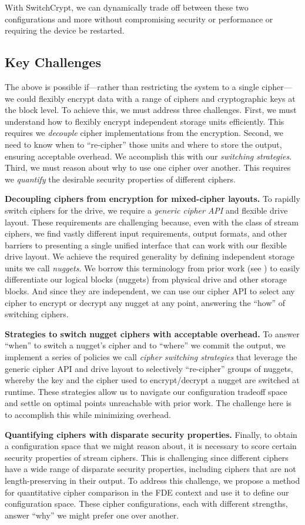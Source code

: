 With SwitchCrypt, we can dynamically trade off between these two configurations and more without
compromising security or performance or requiring the device be restarted.

\subsection{Key Challenges}

The above is possible if---rather than restricting the system to a single
cipher---we could flexibly encrypt data with a range of ciphers and
cryptographic keys at the block level. To achieve this, we must address three
challenges. First, we must understand how to flexibly encrypt independent
storage units efficiently. This requires we \emph{decouple} cipher
implementations from the encryption. Second, we need to know when to
``re-cipher'' those units and where to store the output, ensuring acceptable
overhead. We accomplish this with our \emph{switching strategies}. Third, we
must reason about why to use one cipher over another. This requires we
\emph{quantify} the desirable security properties of different ciphers.

\textbf{Decoupling ciphers from encryption for mixed-cipher layouts.} To rapidly
switch ciphers for the drive, we require a \emph{generic cipher API} and
flexible drive layout. These requirements are challenging because, even with the
class of stream ciphers, we find vastly different input requirements, output
formats, and other barriers to presenting a single unified interface that can
work with our flexible drive layout. We achieve the required generality by
defining independent storage units we call \emph{nuggets}. We borrow this
terminology from prior work (see \cite{StrongBox}) to easily differentiate our
logical blocks (nuggets) from physical drive and other storage blocks. And since
they are independent, we can use our cipher API to select any cipher to encrypt
or decrypt any nugget at any point, answering the ``how'' of switching ciphers.

\textbf{Strategies to switch nugget ciphers with acceptable overhead.} To answer
``when'' to switch a nugget's cipher and to ``where'' we commit the output, we
implement a series of policies we call \textit{cipher switching strategies} that
leverage the generic cipher API and drive layout to selectively ``re-cipher''
groups of nuggets, whereby the key and the cipher used to encrypt/decrypt a
nugget are switched at runtime. These strategies allow us to navigate our
configuration tradeoff space and settle on optimal points unreachable with prior
work. The challenge here is to accomplish this while minimizing overhead.

\textbf{Quantifying ciphers with disparate security properties.} Finally, to
obtain a configuration space that we might reason about, it is necessary to
score certain security properties of stream ciphers. This is challenging since
different ciphers have a wide range of disparate security properties, including
ciphers that are not length-preserving in their output. To address this
challenge, we propose a method for quantitative cipher comparison in the FDE
context and use it to define our configuration space. These cipher
configurations, each with different strengths, answer ``why'' we might prefer
one over another.

